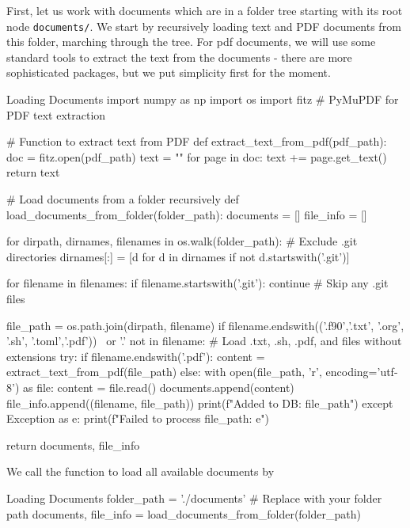 First, let us work with documents which are in a folder tree starting with its root node \texttt{documents/}. 
We start by recursively loading text and PDF documents from this folder, marching through the tree. For pdf documents, we will use some standard tools to extract the text from the documents - there are more sophisticated packages, but we put simplicity first for the moment.  

\begin{codeonly}{Loading Documents}
import numpy as np
import os
import fitz  # PyMuPDF for PDF text extraction

# Function to extract text from PDF
def extract_text_from_pdf(pdf_path):
    doc = fitz.open(pdf_path)
    text = ""
    for page in doc:
        text += page.get_text()
    return text

# Load documents from a folder recursively
def load_documents_from_folder(folder_path):
    documents = []
    file_info = []
    
    for dirpath, dirnames, filenames in os.walk(folder_path):
        # Exclude .git directories
        dirnames[:] = [d for d in dirnames if not d.startswith('.git')]

        for filename in filenames:
            if filename.startswith('.git'):
                continue  # Skip any .git files

            file_path = os.path.join(dirpath, filename)
            if filename.endswith(('.f90','.txt', '.org', '.sh', '.toml','.pdf')) \
                or '.' not in filename:  # Load .txt, .sh, .pdf, and files without extensions
                try:
                    if filename.endswith('.pdf'):
                        content = extract_text_from_pdf(file_path)
                    else:
                        with open(file_path, 'r', encoding='utf-8') as file:
                            content = file.read()
                    documents.append(content)
                    file_info.append((filename, file_path))
                    print(f"Added to DB: {file_path}")
                except Exception as e:
                    print(f"Failed to process {file_path}: {e}")
    
    return documents, file_info
\end{codeonly}

We call the function to load all available documents by 

\begin{codeonly}{Loading Documents}
folder_path = './documents'  # Replace with your folder path
documents, file_info = load_documents_from_folder(folder_path)
\end{codeonly}

